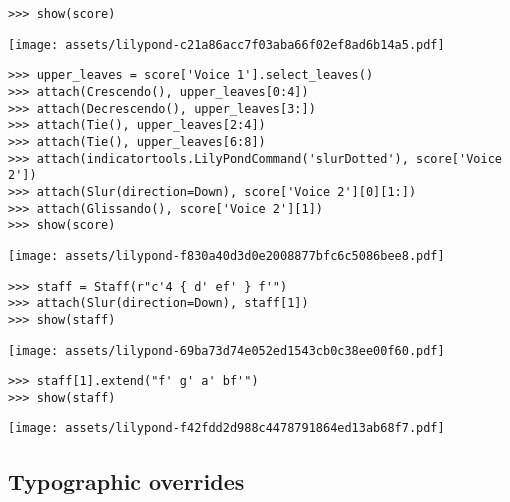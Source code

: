\begin{abjadbookoutput}
\begin{singlespacing}
\vspace{-0.5\baselineskip}
\begin{lstlisting}
>>> show(score)
\end{lstlisting}
\noindent\texttt{[image: assets/lilypond-c21a86acc7f03aba66f02ef8ad6b14a5.pdf]}
\begin{lstlisting}
>>> upper_leaves = score['Voice 1'].select_leaves()
>>> attach(Crescendo(), upper_leaves[0:4])
>>> attach(Decrescendo(), upper_leaves[3:])
>>> attach(Tie(), upper_leaves[2:4])
>>> attach(Tie(), upper_leaves[6:8])
>>> attach(indicatortools.LilyPondCommand('slurDotted'), score['Voice 2'])
>>> attach(Slur(direction=Down), score['Voice 2'][0][1:])
>>> attach(Glissando(), score['Voice 2'][1])
>>> show(score)
\end{lstlisting}
\noindent\texttt{[image: assets/lilypond-f830a40d3d0e2008877bfc6c5086bee8.pdf]}
\end{singlespacing}
\end{abjadbookoutput}

\begin{comment}
<abjad>
staff = Staff(r"c'4 { d' ef' } f'")
attach(Slur(direction=Down), staff[1])
show(staff)
staff[1].extend("f' g' a' bf'")
show(staff)
</abjad>
\end{comment}

\begin{abjadbookoutput}
\begin{singlespacing}
\vspace{-0.5\baselineskip}
\begin{lstlisting}
>>> staff = Staff(r"c'4 { d' ef' } f'")
>>> attach(Slur(direction=Down), staff[1])
>>> show(staff)
\end{lstlisting}
\noindent\texttt{[image: assets/lilypond-69ba73d74e052ed1543cb0c38ee00f60.pdf]}
\begin{lstlisting}
>>> staff[1].extend("f' g' a' bf'")
>>> show(staff)
\end{lstlisting}
\noindent\texttt{[image: assets/lilypond-f42fdd2d988c4478791864ed13ab68f7.pdf]}
\end{singlespacing}
\end{abjadbookoutput}

\subsection{Typographic overrides}

